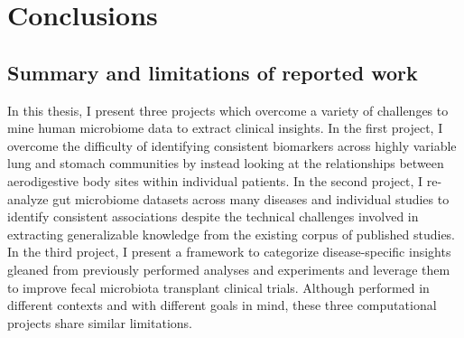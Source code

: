 \chapter{Conclusions}

\section{Summary and limitations of reported work}

In this thesis, I present three projects which overcome a variety of challenges to mine human microbiome data to extract clinical insights.
In the first project, I overcome the difficulty of identifying consistent biomarkers across highly variable lung and stomach communities by instead looking at the relationships between aerodigestive body sites within individual patients.
In the second project, I re-analyze gut microbiome datasets across many diseases and individual studies to identify consistent associations despite the technical challenges involved in extracting generalizable knowledge from the existing corpus of published studies.
In the third project, I present a framework to categorize disease-specific insights gleaned from previously performed analyses and experiments and leverage them to improve fecal microbiota transplant clinical trials.
Although performed in different contexts and with different goals in mind, these three computational projects share similar limitations.

